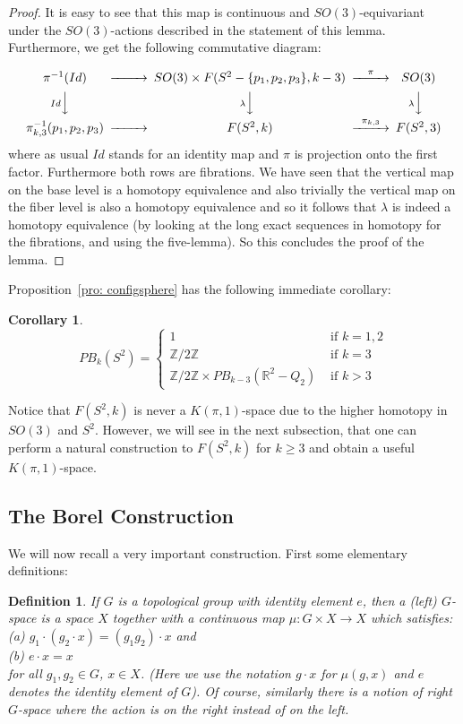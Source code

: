 \documentclass{amsart}
\newtheorem{cor}[thm]{Corollary}
\newtheorem{defn}[thm]{Definition}
\begin{document}
\begin{proof}
It is easy to see that this map is continuous and $SO(3)$-equivariant
under the $SO(3)$-actions described in the statement of this lemma.
Furthermore, we get the following commutative diagram:

$$
\begin{CD}
\pi^{-1}(Id) @>>> SO(3) \times F(S^2-\{p_1,p_2,p_3\},k-3)
@> \pi >> SO(3) \\
@V Id VV @V \lambda VV @V \lambda VV \\
\pi_{k,3}^{-1}(p_1,p_2,p_3) @>>> F(S^2,k) @> \pi_{k,3} >> F(S^2,3)
\end{CD}
$$
where as usual $Id$ stands for an identity map and $\pi$ is projection onto
the first factor. Furthermore both rows are fibrations. We have
seen that the vertical map on the base level is a homotopy equivalence
and also trivially the vertical map on the fiber level is also a homotopy
equivalence and so it follows that $\lambda$ is indeed a homotopy equivalence
(by looking at the long exact sequences in homotopy for the fibrations,
and using the five-lemma).
So this concludes the proof of the lemma.
\end{proof}

Proposition~\ref{pro: configsphere} has the following immediate
corollary:

\begin{cor}
$$
PB_k(S^2) =
\begin{cases}
1 &\text{ if } k=1,2 \\
\mathbb{Z}/2\mathbb{Z} &\text{ if } k=3 \\
\mathbb{Z}/2\mathbb{Z} \times PB_{k-3}(\mathbb{R}^2-Q_2)
&\text{ if } k>3
\end{cases}
$$
\end{cor}

Notice that $F(S^2,k)$ is never a $K(\pi,1)$-space due to the higher
homotopy in $SO(3)$ and $S^2$. However, we will see in the next subsection,
that one can perform a natural construction to $F(S^2,k)$ for $k \geq 3$
and obtain a useful $K(\pi,1)$-space. 

\subsection{The Borel Construction}
We will now recall a very important construction. First some
elementary definitions:

\begin{defn}
If $G$ is a topological group with identity element $e$, then a (left) 
$G$-space is a space $X$
together with a continuous map $\mu : G \times X \rightarrow X$ which 
satisfies: \\
\noindent
(a) $g_1 \cdot (g_2 \cdot x) = (g_1g_2)\cdot x$ and \\
\noindent 
(b) $e \cdot x = x$ \\ 
\noindent
for all $g_1,g_2 \in G$, $x \in X$. (Here we use the notation
$g \cdot x$ for $\mu(g,x)$ and $e$ denotes the identity element of $G$). 
Of course, similarly there is a notion
of right $G$-space where the action is on the right instead of on
the left.
\end{defn}
\end{document}
